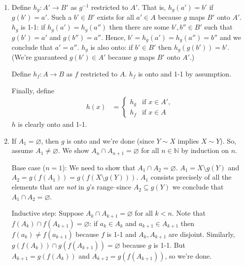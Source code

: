 \documentclass[a4paper]{report}
\newenvironment{ex}[1]
    {\noindent{\large \bf Exercise #1.}}{\vspace{0.5cm}}
\begin{document}
\begin{ex}{1.5.11}
  \begin{enumerate}[label=\alph*)]
  \item Define $h_g : A' \rightarrow B'$ as $g^{-1}$ restricted to $A'$. That
    is, $h_g(a') = b'$ if $g(b') = a'$. Such a $b' \in B'$ exists for all $a'
    \in A$ because $g$ maps $B'$ onto $A'$. $h_g$ is 1-1: if $h_g(a') = h_g(a'')$
    then there are some $b', b'' \in B'$ such that $g(b') = a'$ and $g(b'') =
    a''$.  Hence, $b' = h_g(a') = h_g(a'') = b''$ and we conclude that $a' =
    a''$. $h_g$ is also onto: if $b' \in B'$ then $h_g(g(b')) = b'$. (We're
    guaranteed $g(b') \in A'$ because $g$ maps $B'$ onto $A'$.)

    Define $h_f : A \rightarrow B$ as $f$ restricted to $A$. $h_f$ is onto and
    1-1 by assumption.

    Finally, define
    \begin{align*}
      h(x) &= \begin{cases}
        h_g & \text {if $x \in A'$}, \\
        h_f & \text {if $x \in A$}
              \end{cases}
    \end{align*}
    $h$ is clearly onto and 1-1.
  \item If $A_1 = \varnothing$, then $g$ is onto and we're done (since $Y \sim
    X$ implies $X \sim Y$). So, assume $A_1 \neq \varnothing$. We show $A_n \cap
    A_{n+1} = \varnothing$ for all $n \in \mathbb{N}$ by induction on $n$.

    Base case ($n = 1$): We need to show that $A_1 \cap A_2 = \varnothing$.
    $A_1 = X\setminus g(Y)$ and $A_2 = g(f(A_1)) = g(f(X \setminus g(Y)))$. $A_1$
    consists precisely of all the elements that are \emph{not} in $g$'s
    range--since $A_2 \subseteq g(Y)$ we conclude that $A_1 \cap A_2 =
    \varnothing$.

    Inductive step: Suppose $A_{k} \cap A_{k+1} = \varnothing$ for all $k < n$.
    Note that $f(A_k) \cap f(A_{k+1}) = \varnothing$: if $a_k
    \in A_k$ and $a_{k+1} \in A_{k+1}$ then $f(a_k) \neq f(a_{k+1})$ because $f$
    is 1-1 and $A_{k}, A_{k+1}$ are disjoint. Similarly, $g(f(A_k)) \cap
    g(f(A_{k+1})) = \varnothing$ because $g$ is 1-1. But $A_{k+1} = g(f(A_k))$
    and $A_{k+2} = g(f(A_{k+1}))$, so we're done.


\end{enumerate}
\end{ex}
\end{document}
